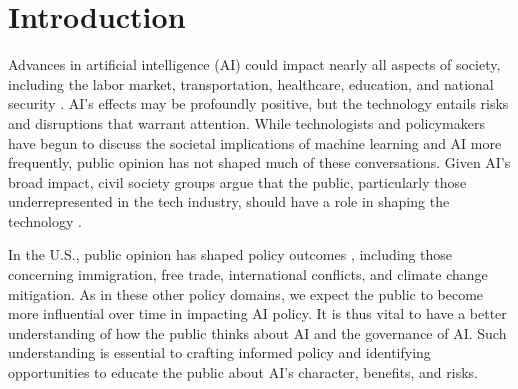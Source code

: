 \documentclass{article}
\begin{document}
\section{Introduction}

\noindent Advances in artificial intelligence (AI) could impact nearly all aspects of society, including the labor market, transportation, healthcare, education, and national security \citep{oecdai}. AI's effects may be profoundly positive, but the technology entails risks and disruptions that warrant attention. While technologists and policymakers have begun to discuss the societal implications of machine learning and AI more frequently, public opinion has not shaped much of these conversations. Given AI's broad impact, civil society groups argue that the public, particularly those underrepresented in the tech industry, should have a role in shaping the technology \citep{west2019}.

In the U.S., public opinion has shaped policy outcomes \citep{caughey2018policy}, including those concerning immigration, free trade, international conflicts, and climate change mitigation. As in these other policy domains, we expect the public to become more influential over time in impacting AI policy. It is thus vital to have a better understanding of how the public thinks about AI and the governance of AI. Such understanding is essential to crafting informed policy and identifying opportunities to educate the public about AI's character, benefits, and risks.
\end{document}
